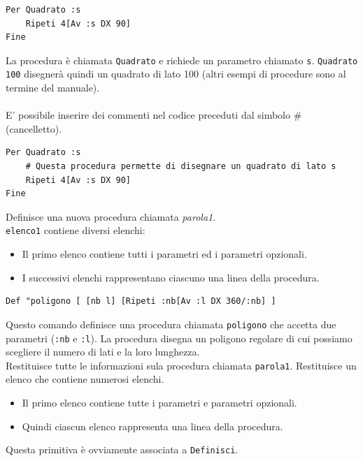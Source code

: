 \begin{lstlisting}[caption="Una semplice procedura"]
Per Quadrato :s
	Ripeti 4[Av :s DX 90]
Fine
\end{lstlisting}

La procedura è chiamata \texttt{Quadrato} e richiede un parametro chiamato \texttt{s}. \texttt{Quadrato 100} disegnerà quindi un quadrato di lato 100 (altri esempi di procedure sono al termine del manuale).\\
\\
E' possibile inserire dei commenti nel codice preceduti dal simbolo \# (cancelletto).\\
\begin{lstlisting}[caption="Commenti nel codice"]
Per Quadrato :s
	# Questa procedura permette di disegnare un quadrato di lato s
	Ripeti 4[Av :s DX 90]
Fine
\end{lstlisting}

Definisce una nuova procedura chiamata \textit{parola1}.\\
\texttt{elenco1} contiene diversi elenchi:
\begin{itemize}
	\item Il primo elenco contiene tutti i parametri ed i parametri opzionali.
	\item I successivi elenchi rappresentano ciascuno una linea della procedura.
\end{itemize}
\begin{lstlisting}[caption="Definizione di una procedura"]
	Def "poligono [ [nb l] [Ripeti :nb[Av :l DX 360/:nb] ]
\end{lstlisting}
Questo comando definisce una procedura chiamata \texttt{poligono} che accetta due parametri (\texttt{:nb} e \texttt{:l}). La procedura disegna un poligono regolare di cui possiamo scegliere il numero di lati e la loro lunghezza. \\

Restituisce tutte le informazioni sula procedura chiamata \texttt{parola1}. Restituisce un elenco che contiene numerosi elenchi.
\begin{itemize}
 \item Il primo elenco contiene tutte i parametri e parametri opzionali.
 \item Quindi ciascun elenco rappresenta una linea della procedura.
\end{itemize}
Questa primitiva è ovviamente associata a \texttt{Definisci}.\\

